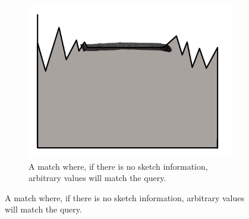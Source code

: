 {\begin{figure}
\begin{subfigure}[t]{.25\textwidth}
		\includegraphics[width=\textwidth]{./figures/dontcare}
		\caption{A match where, if there is no sketch information, arbitrary values will match the query. }
		\label{fig:dontcare}
	\end{subfigure}
	

\end{figure}}
